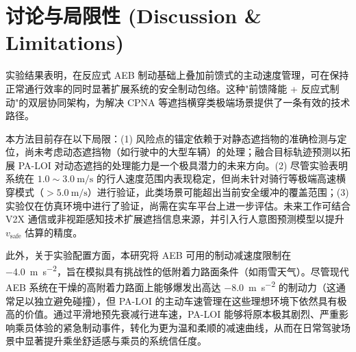 \documentclass[conference]{IEEEtran}
\begin{document}
\begin{table}[htbp]
\caption{在 \SI{4.5}{\meter} 触发距离下的消融实验结果}
\label{tab:ablation}
\centering
\renewcommand{\arraystretch}{1.15}
\end{table}

\section{讨论与局限性 (Discussion \& Limitations)}

实验结果表明，在反应式 AEB 制动基础上叠加前馈式的主动速度管理，可在保持正常通行效率的同时显著扩展系统的安全制动包络。这种"前馈降能 + 反应式制动"的双层协同架构，为解决 CPNA 等遮挡横穿类极端场景提供了一条有效的技术路径。

本方法目前存在以下局限：(1) 风险点的锚定依赖于对静态遮挡物的准确检测与定位，尚未考虑动态遮挡物（如行驶中的大型车辆）的处理；融合目标轨迹预测以拓展 PA-LOI 对动态遮挡的处理能力是一个极具潜力的未来方向。(2) 尽管实验表明系统在 $1.0\sim\SI{3.0}{\meter\per\second}$ 的行人速度范围内表现稳定，但尚未针对骑行等极端高速横穿模式（$>\SI{5.0}{\meter\per\second}$）进行验证，此类场景可能超出当前安全缓冲的覆盖范围；(3) 实验仅在仿真环境中进行了验证，尚需在实车平台上进一步评估。未来工作可结合 V2X 通信或非视距感知技术扩展遮挡信息来源，并引入行人意图预测模型以提升 $v_{\text{safe}}$ 估算的精度。

此外，关于实验配置方面，本研究将 AEB 可用的制动减速度限制在 \SI{-4.0}{\meter\per\second\squared}，旨在模拟具有挑战性的低附着力路面条件（如雨雪天气）。尽管现代 AEB 系统在干燥的高附着力路面上能够爆发出高达 \SI{-8.0}{\meter\per\second\squared} 的制动力（这通常足以独立避免碰撞），但 PA-LOI 的主动车速管理在这些理想环境下依然具有极高的价值。通过平滑地预先衰减行进车速，PA-LOI 能够将原本极其剧烈、严重影响乘员体验的紧急制动事件，转化为更为温和柔顺的减速曲线，从而在日常驾驶场景中显著提升乘坐舒适感与乘员的系统信任度。
\end{document}
